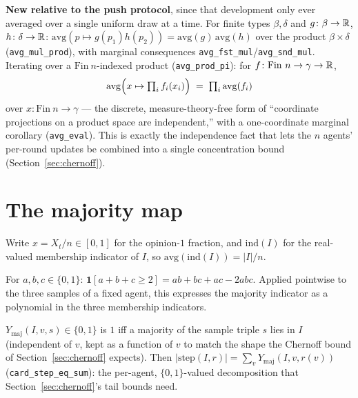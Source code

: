 \begin{lemma}\label{lem:indep}
  \leanok
  \textbf{New relative to the push protocol}, since that development only
  ever averaged over a single uniform draw at a time. For finite types
  $\beta,\delta$ and $g \colon \beta\to\mathbb{R}$, $h\colon\delta\to\mathbb{R}$:
  $\mathrm{avg}(p \mapsto g(p_1)h(p_2)) = \mathrm{avg}(g)\,\mathrm{avg}(h)$
  over the product $\beta\times\delta$ (\texttt{avg\_mul\_prod}), with
  marginal consequences \texttt{avg\_fst\_mul}/\texttt{avg\_snd\_mul}.
  Iterating over a $\mathrm{Fin}\ n$-indexed product
  (\texttt{avg\_prod\_pi}): for $f \colon \mathrm{Fin}\ n \to \gamma \to \mathbb{R}$,
  \[
    \mathrm{avg}\Bigl(x \mapsto \textstyle\prod_i f_i(x_i)\Bigr)
      \;=\; \prod_i \mathrm{avg}(f_i)
  \]
  over $x \colon \mathrm{Fin}\ n \to \gamma$ --- the discrete,
  measure-theory-free form of ``coordinate projections on a product space
  are independent,'' with a one-coordinate marginal corollary
  (\texttt{avg\_eval}). This is exactly the independence fact that lets the
  $n$ agents' per-round updates be combined into a single concentration
  bound (Section~\ref{sec:chernoff}).
\end{lemma}

\section{The majority map}\label{sec:map}

Write $x = X_t/n \in [0,1]$ for the opinion-$1$ fraction, and
$\mathrm{ind}(I)$ for the real-valued membership indicator of $I$, so
$\mathrm{avg}(\mathrm{ind}(I)) = |I|/n$.

\begin{lemma}\label{lem:majpoly}
  \leanok
  For $a,b,c \in \{0,1\}$: $\mathbf 1[a+b+c\ge2] = ab+bc+ac-2abc$. Applied
  pointwise to the three samples of a fixed agent, this expresses the
  majority indicator as a polynomial in the three membership indicators.
\end{lemma}

\begin{definition}\label{def:Ymaj}
  \leanok
  $Y_{\mathrm{maj}}(I,v,s) \in \{0,1\}$ is $1$ iff a majority of the sample
  triple $s$ lies in $I$ (independent of $v$, kept as a function of $v$ to
  match the shape the Chernoff bound of Section~\ref{sec:chernoff} expects).
  Then $|\mathrm{step}(I,r)| = \sum_v Y_{\mathrm{maj}}(I,v,r(v))$
  (\texttt{card\_step\_eq\_sum}): the per-agent, $\{0,1\}$-valued
  decomposition that Section~\ref{sec:chernoff}'s tail bounds need.
\end{definition}

